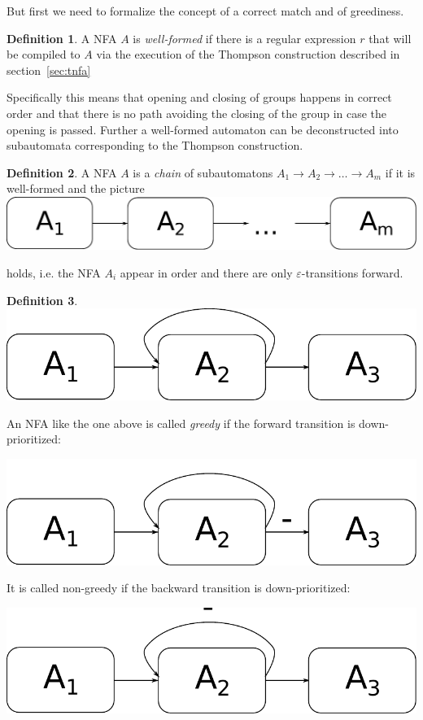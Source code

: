 \documentclass[11pt]{Thesis}
\theoremstyle{definition}
\newtheorem*{defn}{Definition}
\begin{document}
But first we need to formalize the concept of a correct match and of greediness.

\begin{defn}
  A NFA $A$ is \emph{well-formed} if there is a regular expression $r$ that
  will be compiled to $A$ via the execution of the Thompson construction 
  described in section~\ref{sec:tnfa}

  Specifically this means that opening and closing of groups happens in
  correct order and that there is no path avoiding the closing of the group
  in case the opening is passed. Further a well-formed automaton can be
  deconstructed into subautomata corresponding to the Thompson construction.
\end{defn}

\begin{defn}
  A NFA $A$ is a \emph{chain} of subautomatons
  $A_1\rightarrow A_2 \rightarrow \dots \rightarrow A_m$ if it is well-formed
  and the picture
  \includegraphics[width=0.8\linewidth]{graphs/chain}

  holds, i.e. the NFA $A_i$ appear in order and there are only 
  $\varepsilon$-transitions forward.
\end{defn}

\begin{defn}
  \includegraphics[width=0.8\linewidth]{graphs/backward}

  An NFA like the one above is called \emph{greedy} if the forward
  transition is down-prioritized:

  \includegraphics[width=0.8\linewidth]{graphs/backward-greedy}

  It is called non-greedy if the backward transition is down-prioritized:

  \includegraphics[width=0.8\linewidth]{graphs/backward-non}
\end{defn}
\end{document}
